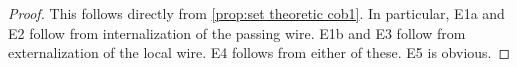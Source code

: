 \documentclass{amsart}
\def\tn{\textnormal}
\def\Hom{\tn{Hom}}
\def\ol{\overline}
\def\Cob{{\bf Cob}}
\newcommand{\inp}[1]{{#1_-}}
\newcommand{\outp}[1]{{#1_+}}
\newcommand{\feeddd}[3]{{\tensor*[^{#2}_{\color{white}{!}}]{{#1}}{^{#3}}}}%
\newcommand{\feeddc}[3]{{\tensor*[^{#2}]{{#1}}{_{#3}}}}
\newcommand{\feedcd}[3]{{\tensor*[_{#2}]{{#1}}{^{#3}}}}
\newcommand{\feedcc}[3]{{\tensor*[^{\color{white}{!}}_{#2}]{{#1}}{_{#3}}}}
\theoremstyle{remark}
\theoremstyle{definition}
\begin{document}
\begin{proof}

This follows directly from \ref{prop:set theoretic cob1}. In particular, E1a and E2 follow from internalization of the passing wire. E1b and E3 follow from externalization of the local wire. E4 follows from either of these. E5 is obvious. 
%
%
% 
%
\end{proof}
\end{document}
